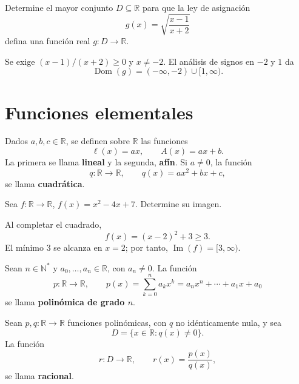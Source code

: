 \begin{ejemplo}
Determine el mayor conjunto $D\subseteq\mathbb{R}$ para que la ley de asignación
\[
g(x)=\sqrt{\frac{x-1}{x+2}}
\]
defina una función real $g:D\to\mathbb{R}$.
\end{ejemplo}
\ifmostrarSoluciones
\begin{solucion}
Se exige $(x-1)/(x+2)\geq0$ y $x\neq-2$. El análisis de signos en $-2$ y $1$ da
\[
\operatorname{Dom}(g)=(-\infty,-2)\cup[1,\infty).
\]
\end{solucion}
\else\vspace{15mm}\fi

\section*{Funciones elementales}

\begin{definicion}
Dados $a,b,c\in\mathbb{R}$, se definen sobre $\mathbb{R}$ las funciones
\[
\ell(x)=ax,\qquad A(x)=ax+b.
\]
La primera se llama \textbf{lineal} y la segunda, \textbf{afín}. Si $a\neq0$, la función
\[
q:\mathbb{R}\to\mathbb{R},\qquad q(x)=ax^2+bx+c,
\]
se llama \textbf{cuadrática}.
\end{definicion}

\begin{ejemplo}
Sea $f:\mathbb{R}\to\mathbb{R}$, $f(x)=x^2-4x+7$. Determine su imagen.
\end{ejemplo}
\ifmostrarSoluciones
\begin{solucion}
Al completar el cuadrado,
\[
f(x)=(x-2)^2+3\geq3.
\]
El mínimo $3$ se alcanza en $x=2$; por tanto, $\operatorname{Im}(f)=[3,\infty)$.
\end{solucion}
\else\vspace{15mm}\fi

\begin{definicion}
Sean $n\in\mathbb{N}^{*}$ y $a_0,\ldots,a_n\in\mathbb{R}$, con $a_n\neq0$. La función
\[
p:\mathbb{R}\to\mathbb{R},\qquad
p(x)=\sum_{k=0}^{n}a_kx^k
=a_nx^n+\cdots+a_1x+a_0
\]
se llama \textbf{polinómica de grado $n$}.
\end{definicion}

\begin{definicion}
Sean $p,q:\mathbb{R}\to\mathbb{R}$ funciones polinómicas, con $q$ no idénticamente nula, y sea
\[
D=\{x\in\mathbb{R}:q(x)\neq0\}.
\]
La función
\[
r:D\to\mathbb{R},\qquad r(x)=\frac{p(x)}{q(x)},
\]
se llama \textbf{racional}.
\end{definicion}

